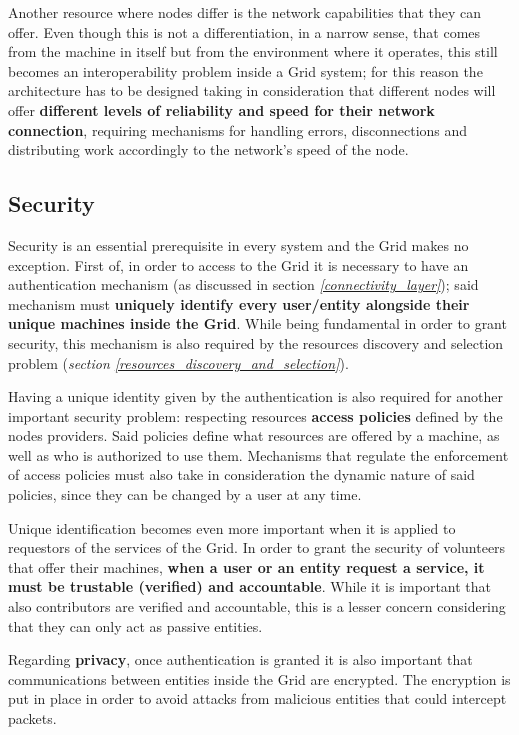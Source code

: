 Another resource where nodes differ is the network capabilities that they can offer. Even though this is not a differentiation, in a narrow sense, that comes from the machine in itself but from the environment where it operates, this still becomes an interoperability problem inside a Grid system; for this reason the architecture has to be designed taking in consideration that different nodes will offer \textbf{different levels of reliability and speed for their network connection}, requiring mechanisms for handling errors, disconnections and distributing work accordingly to the network's speed of the node. 

\subsection{Security}\label{security}
Security is an essential prerequisite in every system and the Grid makes no exception. First of, in order to access to the Grid it is necessary to have an authentication mechanism (as discussed in section \textit{\ref{connectivity_layer}}); said mechanism must \textbf{uniquely identify every user/entity alongside their unique machines inside the Grid}. While being fundamental in order to grant security, this mechanism is also required by the resources discovery and selection problem (\textit{section \ref{resources_discovery_and_selection}}).

Having a unique identity given by the authentication is also required for another important security problem: respecting resources \textbf{access policies} defined by the nodes providers. Said policies define what resources are offered by a machine, as well as who is authorized to use them. Mechanisms that regulate the enforcement of access policies must also take in consideration the dynamic nature of said policies, since they can be changed by a user at any time.

Unique identification becomes even more important when it is applied to requestors of the services of the Grid. In order to grant the security of volunteers that offer their machines, \textbf{when a user or an entity request a service, it must be trustable (verified) and accountable}. While it is important that also contributors are verified and accountable, this is a lesser concern considering that they can only act as passive entities.

Regarding \textbf{privacy}, once authentication is granted it is also important that communications between entities inside the Grid are encrypted. The encryption is put in place in order to avoid attacks from malicious entities that could intercept packets.

